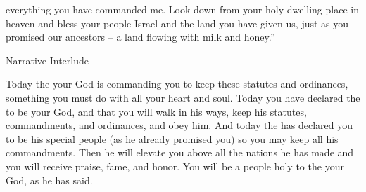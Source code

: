 {everything
you have
commanded me.
Look
down from
your holy
dwelling place
in heaven
and bless
your people
Israel
and the land
you have
given
us, just
as you promised
our ancestors
– a land
flowing
with milk
and honey.”
\par }{\SH Narrative Interlude
\par }{\PP {}Today
the {}
your God
is commanding
you to keep
these
statutes
and ordinances,
something
you must do
with all
your heart
and soul.
Today
you have declared
the {}
to be
your God,
and that you will walk
in his ways,
keep
his statutes,
commandments,
and ordinances,
and obey
him.
And today
the {}
has declared
you to be
his special
people
(as
he already promised
you) so you may keep
all
his commandments.
Then he will elevate
you above
all
the nations
he has
made
and you will receive praise,
fame,
and honor.
You will be
a people
holy
to the
{}
your God,
as he has said.

}
